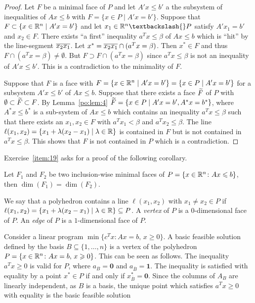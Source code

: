 \begin{proof}
  Let $F$ be a minimal face of $P$ and let $A'x\leq b'$ a the subsystem
  of inequalities of $Ax\leq b$ with $F = \{ x \in P \mid A'x=b'\}$. Suppose that
  $F \subset \{x\in\mathbb{R}^n  \mid A'x=b'\}$ and let $x_1 \in \setR^n \textbackslash{} P$ satisfy
  $A'x_1=b'$ and  $x_2 \in F$.  There exists ``a first''  inequality $a^Tx\leq\beta$ of
  $Ax\leq b$ which is ``hit'' by the line-segment  $\overline{x_2x_1}$. Let $x^* =
  \overline{x_2x_1}\cap(a^Tx=\beta)$. Then $x^*\in F$ and thus $F \cap (a^Tx=\beta) \neq
  \emptyset$. But $F \supset F \cap (a^Tx=\beta)$ since $a^Tx \leq\beta$ is not an inequality of
  $A'x\leq b'$. This is a contradiction to the minimality of $F$. 

  
  Suppose that $F$ is a face with $F = \{x \in \mathbb{R}^n \mid A'x= b'\}
  = \{x \in P \mid A'x=b'\}$ for a subsystem $A'x\leq b'$ of $Ax\leq
  b$. Suppose that there exists a face $\widetilde{F}$ of $P$ with $\emptyset
  \subset \widetilde{F}\subset F$. By Lemma~\ref{po:lem:4} $\widetilde{F} = \{ x \in
  P \mid A'x=b', A^*x=b^*\}$, where $A^*x\leq b^*$ is a sub-system of
  $Ax\leq b$ which contains an inequality $a^Tx\leq\beta$ such that
  there exists an $x_1,x_2 \in F$ with $a^Tx_1<\beta$ and
  $a^Tx_2\leq\beta$.  The line $\ell(x_1,x_2) = \{ x_1 +
  \lambda(x_2-x_1) \mid \lambda \in \mathbb{R}\}$ is contained in $F$ but
  is not contained in $a^Tx\leq\beta$. This shows that $F$ is not
  contained in $P$ which is a contradiction.
\end{proof}

Exercise~\ref{item:19} asks for a proof of the following corollary. 
\begin{corollary}
  \label{co:8}
  Let $F_1$ and $F_2$ be two inclusion-wise minimal faces of
  $P=\{x\in\mathbb{R}^n\colon Ax \leqslant b\}$, then $\dim(F_1) = \dim(F_2)$.
\end{corollary}

We say that a polyhedron contains a line $\ell(x_1,x_2)$ with $x_1
\neq x_2 \in P$ if $\ell(x_1,x_2) = \{ x_1 + \lambda(x_2-x_1) \mid
\lambda \in \mathbb{R} \}\subseteq P$. A \emph{vertex} of $P$ is a
$0$-dimensional face of $P$. An \emph{edge} of $P$ is a
$1$-dimensional face of $P$.






\begin{example}
Consider a linear program $\min\{c^Tx \colon Ax = b,\, x\geq0\}$. A basic
feasible solution  defined by the basis $B\subseteq\{1,\ldots,n\}$ is a vertex of
the polyhedron $P = \{x \in \mathbb{R}^n \colon Ax = b,\, x\geqslant0\}$. This can be seen
as follows. The inequality $a^Tx\geq0$ is valid for $P$, where $a_B =
\mathbf{0}$ and $a_{\overline{B}} = \mathbf{1}$. The inequality is
satisfied with equality by a point $x^* \in P$ if and only if
$x^*_{\overline{B}} = \mathbf{0}$. Since the columns of $A_B$ are
linearly independent, as $B$ is a basis, the unique point which
satisfies $a^Tx\geq0$ with equality is the basic feasible solution  
\end{example}

